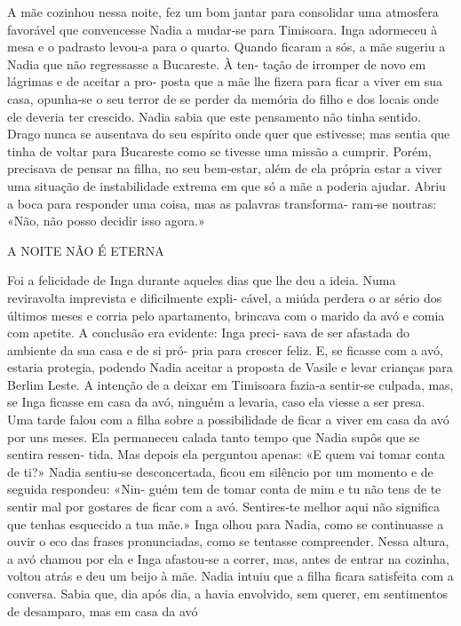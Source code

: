 A mãe cozinhou nessa noite, fez um bom jantar para consolidar uma
atmosfera favorável que convencesse Nadia a mudar‑se para Timisoara.
Inga adormeceu à mesa e o padrasto levou‑a para o quarto. Quando ficaram
a sós, a mãe sugeriu a Nadia que não regressasse a Bucareste. À ten‑
tação de irromper de novo em lágrimas e de aceitar a pro‑ posta que a
mãe lhe fizera para ficar a viver em sua casa, opunha‑se o seu terror de
se perder da memória do filho e dos locais onde ele deveria ter
crescido. Nadia sabia que este pensamento não tinha sentido. Drago nunca
se ausentava do seu espírito onde quer que estivesse; mas sentia que
tinha de voltar para Bucareste como se tivesse uma missão a cumprir.
Porém, precisava de pensar na filha, no seu bem‑estar, além de ela
própria estar a viver uma situação de instabilidade extrema em que só a
mãe a poderia ajudar. Abriu a boca para responder uma coisa, mas as
palavras transforma‑ ram‑se noutras: «Não, não posso decidir isso
agora.»

A NOITE NÃO É ETERNA

Foi a felicidade de Inga durante aqueles dias que lhe deu a ideia. Numa
reviravolta imprevista e dificilmente expli‑ cável, a miúda perdera o ar
sério dos últimos meses e corria pelo apartamento, brincava com o marido
da avó e comia com apetite. A conclusão era evidente: Inga preci‑ sava
de ser afastada do ambiente da sua casa e de si pró‑ pria para crescer
feliz. E, se ficasse com a avó, estaria protegia, podendo Nadia aceitar
a proposta de Vasile e levar crianças para Berlim Leste. A intenção de a
deixar em Timisoara fazia‑a sentir‑se culpada, mas, se Inga ficasse em
casa da avó, ninguém a levaria, caso ela viesse a ser presa. Uma tarde
falou com a filha sobre a possibilidade de ficar a viver em casa da avó
por uns meses. Ela permaneceu calada tanto tempo que Nadia supôs que se
sentira ressen‑ tida. Mas depois ela perguntou apenas: «E quem vai tomar
conta de ti?» Nadia sentiu‑se desconcertada, ficou em silêncio por um
momento e de seguida respondeu: «Nin‑ guém tem de tomar conta de mim e
tu não tens de te sentir mal por gostares de ficar com a avó.
Sentires‑te melhor aqui não significa que tenhas esquecido a tua mãe.»
Inga olhou para Nadia, como se continuasse a ouvir o eco das frases
pronunciadas, como se tentasse compreender. Nessa altura, a avó chamou
por ela e Inga afastou‑se a correr, mas, antes de entrar na cozinha,
voltou atrás e deu um beijo à mãe. Nadia intuiu que a filha ficara
satisfeita com a conversa. Sabia que, dia após dia, a havia envolvido,
sem querer, em sentimentos de desamparo, mas em casa da avó

